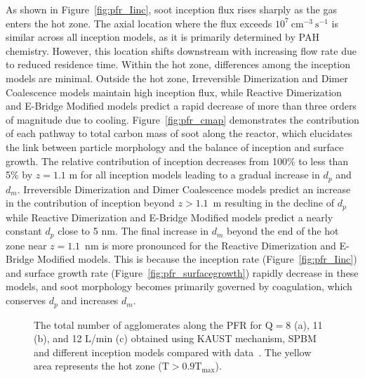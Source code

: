 As shown in Figure~\ref{fig:pfr_Iinc}, soot inception flux rises sharply as the gas enters the hot zone. The axial location where the flux exceeds $10^7~\mathrm{cm^{-3}~s^{-1}}$ is similar across all inception models, as it is primarily determined by PAH chemistry. However, this location shifts downstream with increasing flow rate due to reduced residence time. Within the hot zone, differences among the inception models are minimal. Outside the hot zone, Irreversible Dimerization and Dimer Coalescence models maintain high inception flux, while Reactive Dimerization and E-Bridge Modified models predict a rapid decrease of more than three orders of magnitude due to cooling. Figure~\ref{fig:pfr_cmap} demonstrates the contribution of each pathway to total carbon mass of soot along the reactor, which elucidates the link between particle morphology and the balance of inception and surface growth. The relative contribution of inception decreases from 100\% to less than 5\% by $z=1.1$ m for all inception models leading to a gradual increase in $d_p$ and $d_m$. Irreversible Dimerization and Dimer Coalescence models predict an increase in the contribution of inception beyond $z>1.1$~m resulting in the decline of $d_p$ while Reactive Dimerization and E-Bridge Modified models predict a nearly constant $d_p$ close to 5 nm. The final increase in $d_m$ beyond the end of the hot zone near $z = 1.1$~nm is more pronounced for the Reactive Dimerization and E-Bridge Modified models. This is because the inception rate (Figure~\ref{fig:pfr_Iinc}) and surface growth rate (Figure~\ref{fig:pfr_surfacegrowth}) rapidly decrease in these models, and soot morphology becomes primarily governed by coagulation, which conserves $d_p$ and increases $d_m$.



\begin{figure}[H]
	\centering
	\caption{The total number of agglomerates along the PFR for $\mathrm{Q}=8$ (a), 11 (b), and 12 L/min (c) obtained using KAUST mechanism, SPBM and different inception models compared with data~\citep{mei2019quantitative}. The yellow area represents the hot zone ($\mathrm{T}>0.9\mathrm{T_{max}}$).}
	\label{fig:pfr_Nagg} 
\end{figure}

